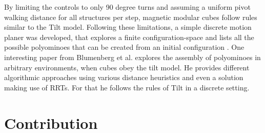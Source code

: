 By limiting the controls to only 90 degree turns and assuming a uniform pivot walking distance for all structures per step, magnetic modular cubes follow rules similar to the Tilt model.
Following these limitations, a simple discrete motion planer was developed, that explores a finite configuration-space and lists all the possible polyominoes that can be created from an initial configuration \cite{Bhattacharjee2022}.
One interesting paper from Blumenberg et al. \cite{blumenberg2023} explores the assembly of polyominoes in arbitrary environments, when cubes obey the tilt model.
He provides different algorithmic approaches using various distance heuristics and even a solution making use of RRTs.
For that he follows the rules of Tilt in a discrete setting.


\section{Contribution}
